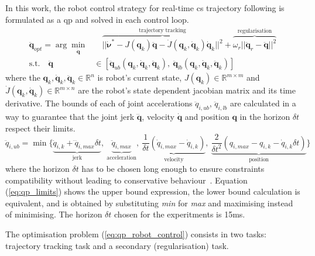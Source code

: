In this work, the robot control strategy for real-time \gls{cs} trajectory following is formulated as a \gls{qp} and solved in each control loop. 
\begin{equation}
\begin{split}
    \ddot{\bm{q}}_{opt} = \arg \min_{\ddot{\bm{q}}}& \quad \overbrace{|| \dot{\bm{\nu}}^* - J(\bm{q}_k)\ddot{\bm{q}} - \dot{J}(\bm{q}_k,\dot{\bm{q}}_k)\dot{\bm{q}}_k ||^2}^{\text{trajectory tracking}} + \overbrace{\omega_r || \ddot{\bm{q}}_r - \ddot{\bm{q}} ||^2}^{\text{regularisation}} \\
    \text{s.t.} \quad \ddot{\bm{q}} &\in [\ddot{\bm{q}}_{ub}(\bm{q}_k,\dot{\bm{q}}_k,\ddot{\bm{q}}_k), ~\ddot{\bm{q}}_{lb}(\bm{q}_k,\dot{\bm{q}}_k,\ddot{\bm{q}}_k)]
\end{split}
\label{eq:qp_robot_control}
\end{equation}
where the $\bm{q}_k,\dot{\bm{q}}_k,\ddot{\bm{q}}_k\in\mathbb{R}^n$ is robot's current state, $J(\bm{q}_k)\in\mathbb{R}^{m\times m}$ and $\dot{J}(\bm{q}_k,\dot{\bm{q}}_k)\in\mathbb{R}^{m\times n}$ are the robot's state dependent jacobian matrix and its time derivative. The bounds of each of joint accelerations $\ddot{{q}}_{i,ub}$, $\ddot{{q}}_{i,lb}$ are calculated in a way to guarantee that the joint jerk $\dddot{\bm{q}}$, velocity $\dot{\bm{q}}$ and position $\bm{q}$ in the horizon $\delta t$ respect their limits. 
\begin{equation}
    \ddot{{q}}_{i,ub} = \min  \Big\{ \underbrace{\ddot{{q}}_{i,k} + \dddot{q}_{i,max}\delta t}_{\text{jerk}}, ~
    \underbrace{\ddot{{q}}_{i,max}}_{\text{acceleration}}, ~ 
    \underbrace{\frac{1}{\delta  t}(\dot{{q}}_{i,max} - \dot{{q}}_{i,k})}_{\text{velocity}}, ~
    \underbrace{\frac{2}{\delta  t^2}({{q}}_{i,max} - {{q}}_{i,k} - \dot{{q}}_{i,k}\delta  t )}_{\text{position}}
    \Big\}  
\label{eq:qp_limits}
\end{equation}
where the horizon $\delta t$ has to be chosen long enough to ensure constraints compatibility without leading to conservative behaviour~\cite{Prete2018}. Equation (\ref{eq:qp_limits}) shows the upper bound expression, the lower bound calculation is equivalent, and is obtained by substituting \textit{min} for \textit{max} and maximising instead of minimising.  The horizon $\delta t$ chosen for the experitments is 15ms. 

The optimisation problem  (\ref{eq:qp_robot_control}) consists in two tasks: trajectory tracking task and a secondary (regularisation) task.

